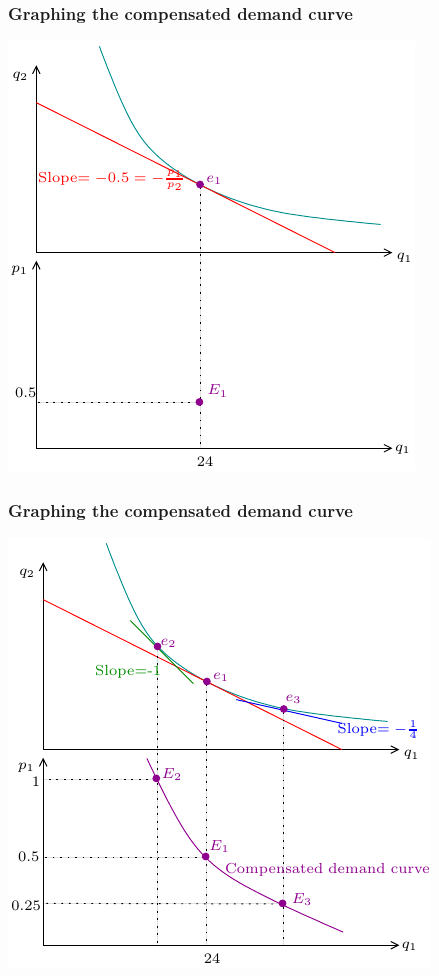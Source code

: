 \documentclass[xcolor=pdftex,dvipsnames]{beamer}
\begin{document}
\begin{frame}\frametitle{Graphing the compensated demand curve }
\begin{center}
\includegraphics{pics/CompensatedDemand}
\end{center}


\end{frame}
\begin{frame}\frametitle{Graphing the compensated demand curve }
\begin{center}
\includegraphics{pics/CompensatedDemand2}
\end{center}


\end{frame}
\end{document}
